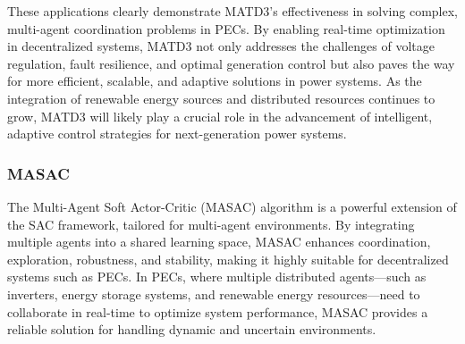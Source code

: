 
These applications clearly demonstrate MATD3's effectiveness in solving complex, multi-agent coordination problems in PECs. By enabling real-time optimization in decentralized systems, MATD3 not only addresses the challenges of voltage regulation, fault resilience, and optimal generation control but also paves the way for more efficient, scalable, and adaptive solutions in power systems. As the integration of renewable energy sources and distributed resources continues to grow, MATD3 will likely play a crucial role in the advancement of intelligent, adaptive control strategies for next-generation power systems.

\subsubsection{MASAC}

The Multi-Agent Soft Actor-Critic (MASAC) algorithm is a powerful extension of the SAC framework, tailored for multi-agent environments. By integrating multiple agents into a shared learning space, MASAC enhances coordination, exploration, robustness, and stability, making it highly suitable for decentralized systems such as PECs. In PECs, where multiple distributed agents—such as inverters, energy storage systems, and renewable energy resources—need to collaborate in real-time to optimize system performance, MASAC provides a reliable solution for handling dynamic and uncertain environments.

